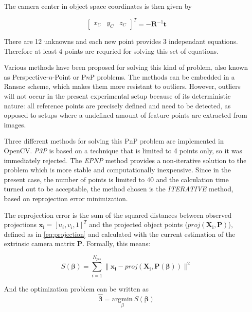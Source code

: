 The camera center in object space coordinates is then given by

\begin{equation}
    \begin{bmatrix} x_C & y_C & z_C \end{bmatrix}^T = -\mathbf{R}^{-1} \mathbf{t}
\end{equation}

There are 12 unknowns and each new point provides 3 independant equations. Therefore at least 4 points are requried for solving this set of equations. 

Various methods have been proposed for solving this kind of problem, also known as Perspective-$n$-Point or P$n$P problems. 
The methods can be embedded in a Ransac scheme, which makes them more resistant to outliers. However, outliers will not occur in the present experimental setup because of its deterministic nature: all reference points are precisely defined and need to be detected, as opposed to setups where a undefined amount of feature points are extracted from images.

Three different methods for solving this PnP problem are implemented in OpenCV.
\textit{P3P} is based on a technique that is limited to 4 points only, so it was immediately rejected. The \textit{EPNP} method \cite{Lepetit2009} provides a non-iterative solution to the problem which is more stable and computationally inexpensive. Since in the present case, the number of points is limited to 40 and the calculation time turned out to be acceptable, the method chosen is the \textit{ITERATIVE} method, based on reprojection error minimization.

The reprojection error is the sum of the squared distances between observed projections $\mathbf{x_i}=[u_i,v_i,1]^T$ and the projected object points ($proj(\mathbf{X_i},\mathbf{P})$), defined as in \eqref{eq:projection} and calculated with the current estimation of the extrinsic camera matrix $\mathbf{P}$. Formally, this means:

\begin{equation}
S(\boldsymbol\beta) = \sum_{i=1}^{N_{pts}} \| \mathbf{x_i}-proj(\mathbf{X_i},\mathbf{P}(\boldsymbol\beta)) \| ^2
\end{equation}

And the optimization problem can be written as
\begin{equation}
    \hat{\boldsymbol\beta} = \underset{\beta} {\mathrm{argmin}} ~S(\boldsymbol\beta)
\end{equation}

